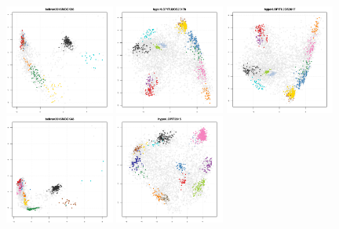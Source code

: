 \documentclass[12pt]{article}\usepackage[]{graphicx}\usepackage[]{color}
\begin{document}
\begin{appendices}
\begin{figure}[htb]
\centering
  \includegraphics[width = 0.32\textwidth]{./figure/figpca-1.pdf}
  \includegraphics[width = 0.32\textwidth]{./figure/figpca-2.pdf}
  \includegraphics[width = 0.32\textwidth]{./figure/figpca-3.pdf}
  \includegraphics[width = 0.32\textwidth]{./figure/figpca-4.pdf}
  \includegraphics[width = 0.32\textwidth]{./figure/figpca-5.pdf}

\end{figure}
\end{appendices}
\end{document}
